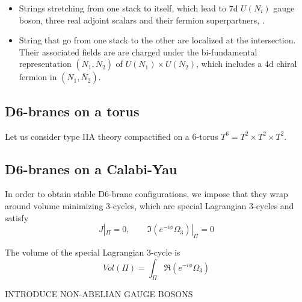 \begin{itemize}
  \item Strings stretching from one stack to itself, which lead to 7d $U(N_i)$ gauge boson, three real
    adjoint scalars and their fermion superpartners, .
  \item String that go from one stack to the other are localized at the intersection. 
    Their associated fields are are charged under the bi-fundamental representation $(N_1, \bar N_2)$ of 
    $U(N_1)\times U(N_2)$, which includes a 4d chiral fermion in $(N_1,\bar N_2)$.
\end{itemize}

\subsection{D6-branes on a torus}

Let us consider type IIA theory compactified on a 6-torus $T^6=T^2 \times T^2 \times T^2$.

\subsection{D6-branes on a Calabi-Yau}
In order to obtain stable D6-brane configurations, we impose that they wrap around volume 
minimizing 3-cycles, which are special Lagrangian 3-cycles and satisfy
\begin{equation}
  J|_\Pi = 0 , \qquad \Im (e^{-i\phi}\Omega_3)|_\Pi=0
\end{equation}

The volume of the special Lagrangian 3-cycle is
\begin{equation}
  Vol(\Pi)=\int_\Pi \Re(e^{-i\phi}\Omega_3)
\end{equation}




INTRODUCE NON-ABELIAN GAUGE BOSONS
